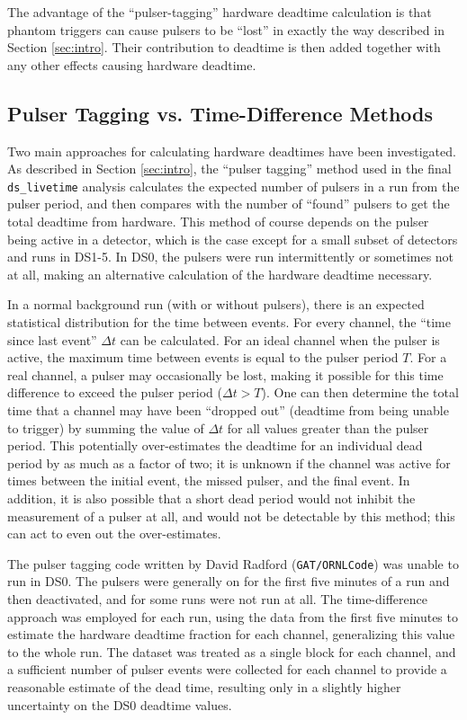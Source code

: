 \documentclass[notitlepage,rmp,aps,10pt]{revtex4-1}
\newcommand{\tty}{\texttt}
\begin{document}
The advantage of the ``pulser-tagging'' hardware deadtime calculation is that phantom triggers can cause pulsers to be ``lost'' in exactly the way described in Section \ref{sec:intro}.  Their contribution to deadtime is then added together with any other effects causing hardware deadtime.


\subsection{Pulser Tagging vs. Time-Difference Methods} \label{sec:timeDiff}

Two main approaches for calculating hardware deadtimes have been investigated.
As described in Section \ref{sec:intro}, the ``pulser tagging'' method used in the final \tty{ds\_livetime} analysis calculates the expected number of pulsers in a run from the pulser period, and then compares with the number of ``found'' pulsers to get the total deadtime from hardware.
This method of course depends on the pulser being active in a detector, which is the case except for a small subset of detectors and runs in DS1-5.  In DS0, the pulsers were run intermittently or sometimes not at all, making an alternative calculation of the hardware deadtime necessary.

In a normal background run (with or without pulsers), there is an expected statistical distribution for the time between events.  For every channel, the ``time since last event'' $\Delta t$ can be calculated.  For an ideal channel when the pulser is active, the maximum time between events is equal to the pulser period $T$.  For a real channel, a pulser may occasionally be lost, making it possible for this time difference to exceed the pulser period ($\Delta t > T$).  One can then determine the total time that a channel may have been ``dropped out'' (deadtime from being unable to trigger) by summing the value of $\Delta t$ for all values greater than the pulser period.  This potentially over-estimates the deadtime for an individual dead period by as much as a factor of two; it is unknown if the channel was active for times between the initial event, the missed pulser, and the final event.  In addition, it is also possible that a short dead period would not inhibit the measurement of a pulser at all, and would not be detectable by this method; this can act to even out the over-estimates.

The pulser tagging code written by David Radford (\tty{GAT/ORNLCode}) was unable to run in DS0.  The pulsers were generally on for the first five minutes of a run and then deactivated, and for some runs were not run at all.  The time-difference approach was employed for each run, using the data from the first five minutes to estimate the hardware deadtime fraction for each channel, generalizing this value to the whole run.  The dataset was treated as a single block for each channel, and a sufficient number of pulser events were collected for each channel to provide a reasonable estimate of the dead time, resulting only in a slightly higher uncertainty on the DS0 deadtime values.
\end{document}
